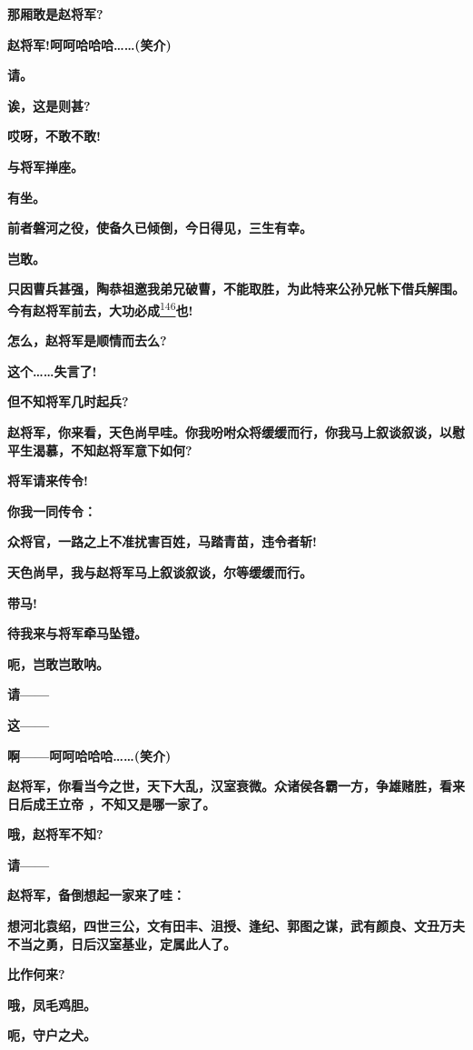 \textbf{那厢敢是赵将军?}

\textbf{赵将军!呵呵哈哈哈\ldots{}\ldots{}(笑介)}

\textbf{请。}

\textbf{诶，这是则甚?}

\textbf{哎呀，不敢不敢!}

\textbf{与将军掸座。}

\textbf{有坐。}

\textbf{前者磐河之役，使备久已倾倒，今日得见，三生有幸。}

\textbf{岂敢。}

\textbf{只因曹兵甚强，陶恭祖邀我弟兄破曹，不能取胜，为此特来公孙兄帐下借兵解围。今有赵将军前去，大功必成}\protect\hyperlink{fn146}{\textsuperscript{146}}\textbf{也!}

\textbf{怎么，赵将军是顺情而去么?}

\textbf{这个\ldots{}\ldots{}失言了!}

\textbf{但不知将军几时起兵?}

\textbf{赵将军，你来看，天色尚早哇。你我吩咐众将缓缓而行，你我马上叙谈叙谈，以慰平生渴慕，不知赵将军意下如何?}

\textbf{将军请来传令!}

\textbf{你我一同传令：}

\textbf{众将官，一路之上不准扰害百姓，马踏青苗，违令者斩!}

\textbf{天色尚早，我与赵将军马上叙谈叙谈，尔等缓缓而行。}

\textbf{带马!}

\textbf{待我来与将军牵马坠镫。}

\textbf{呃，岂敢岂敢呐。}

\textbf{请------}

\textbf{这------}

\textbf{啊------呵呵哈哈哈\ldots{}\ldots{}(笑介)}

\textbf{赵将军，你看当今之世，天下大乱，汉室衰微。众诸侯各霸一方，争雄赌胜，看来日后成王立帝
，不知又是哪一家了。}

\textbf{哦，赵将军不知?}

\textbf{请------}

\textbf{赵将军，备倒想起一家来了哇：}

\textbf{想河北袁绍，四世三公，文有田丰、沮授、逢纪、郭图之谋，武有颜良、文丑万夫不当之勇，日后汉室基业，定属此人了。}

\textbf{比作何来?}

\textbf{哦，凤毛鸡胆。}

\textbf{呃，守户之犬。}

